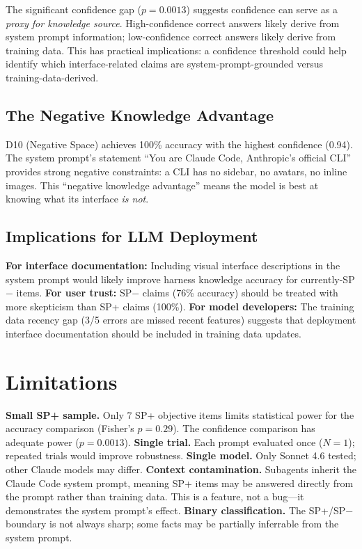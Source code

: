 \documentclass[10pt,twocolumn]{article}
\begin{document}
The significant confidence gap ($p{=}0.0013$) suggests confidence can serve as a \textit{proxy for knowledge source}.
High-confidence correct answers likely derive from system prompt information; low-confidence correct answers likely derive from training data.
This has practical implications: a confidence threshold could help identify which interface-related claims are system-prompt-grounded versus training-data-derived.

\subsection{The Negative Knowledge Advantage}

D10 (Negative Space) achieves 100\% accuracy with the highest confidence (0.94).
The system prompt's statement ``You are Claude Code, Anthropic's official CLI'' provides strong negative constraints: a CLI has no sidebar, no avatars, no inline images.
This ``negative knowledge advantage'' means the model is best at knowing what its interface \textit{is not}.

\subsection{Implications for LLM Deployment}

\textbf{For interface documentation:} Including visual interface descriptions in the system prompt would likely improve harness knowledge accuracy for currently-SP$-$ items.
\textbf{For user trust:} SP$-$ claims (76\% accuracy) should be treated with more skepticism than SP+ claims (100\%).
\textbf{For model developers:} The training data recency gap (3/5 errors are missed recent features) suggests that deployment interface documentation should be included in training data updates.

\section{Limitations}

\textbf{Small SP+ sample.} Only 7 SP+ objective items limits statistical power for the accuracy comparison (Fisher's $p{=}0.29$). The confidence comparison has adequate power ($p{=}0.0013$).
\textbf{Single trial.} Each prompt evaluated once ($N{=}1$); repeated trials would improve robustness.
\textbf{Single model.} Only Sonnet 4.6 tested; other Claude models may differ.
\textbf{Context contamination.} Subagents inherit the Claude Code system prompt, meaning SP+ items may be answered directly from the prompt rather than training data. This is a feature, not a bug---it demonstrates the system prompt's effect.
\textbf{Binary classification.} The SP+/SP$-$ boundary is not always sharp; some facts may be partially inferrable from the system prompt.
\end{document}
